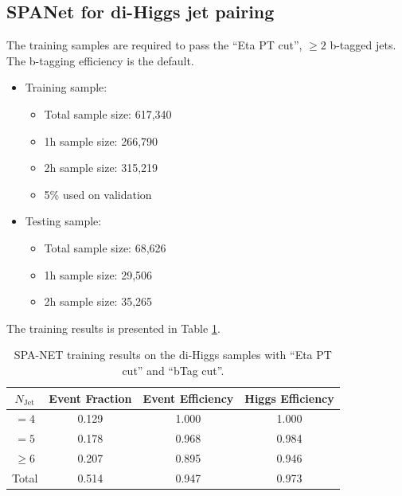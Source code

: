 \documentclass[12pt]{article}
\begin{document}
	\subsection{SPANet for di-Higgs jet pairing}%
	\label{sub:spanet_for_di_higgs_jet_pairing}
		The training samples are required to pass the ``Eta PT cut'', $\ge 2$ b-tagged jets. The b-tagging efficiency is the default.
		\begin{itemize}
			\item Training sample:
			\begin{itemize}
				\item Total sample size: 617,340
				\item 1h sample size: 266,790
				\item 2h sample size: 315,219
				\item 5\% used on validation
			\end{itemize}
			\item Testing sample: 
			\begin{itemize}
				\item Total sample size: 68,626
				\item 1h sample size: 29,506
				\item 2h sample size: 35,265
			\end{itemize}
		\end{itemize}
		The training results is presented in Table \ref{tab:SPANet_diHiggs_2btag_default_pt_cut}.
		\begin{table}[htpb]
			\centering
			\caption{SPA-NET training results on the di-Higgs samples with ``Eta PT cut'' and ``bTag cut''.}
			\label{tab:SPANet_diHiggs_2btag_default_pt_cut}
			\begin{tabular}{c|c|cc}
				$N_\text{Jet}$ & Event Fraction & Event Efficiency & Higgs Efficiency \\
				\hline
				$=4$	  &   0.129             &    1.000              &    1.000             \\
				$=5$	  &   0.178             &    0.968              &    0.984             \\
				$\ge 6$	  &   0.207             &    0.895              &    0.946             \\
				Total	  &   0.514             &    0.947              &    0.973             \\
			\end{tabular}
		\end{table}

	
\end{document}
